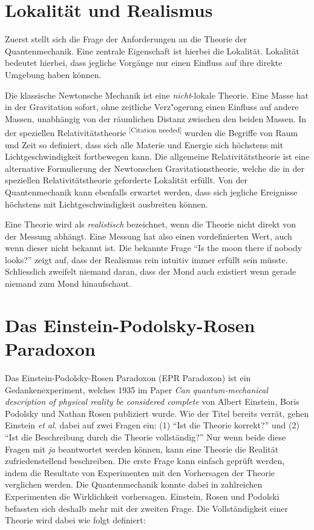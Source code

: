 \begin{refsection}
\section{Lokalit\"at und Realismus\label{section:bell:lokalitaet}}
Zuerst stellt sich die Frage der Anforderungen an die Theorie der
Quantenmechanik. Eine zentrale Eigenschaft ist hierbei die Lokalit\"at.
Lokalit\"at bedeutet hierbei, dass jegliche Vorg\"ange nur einen Einfluss
auf ihre direkte Umgebung haben k\"onnen.

Die klassische Newtonsche Mechanik ist eine \emph{nicht}-lokale 
Theorie. Eine Masse hat in der Gravitation sofort, ohne zeitliche 
Verz"ogerung einen Einfluss auf andere Massen, unabh\"angig von der
r\"aumlichen Distanz zwischen den beiden Massen. 
In der speziellen Relativit\"atstheorie 
\textsuperscript{[Citation needed]}
wurden die Begriffe von Raum und Zeit so definiert, dass sich alle
Materie und Energie sich h\"ochstens mit Lichtgeschwindigkeit fortbewegen
kann. 
Die allgemeine Relativit\"atstheorie ist eine alternative Formulierung
der Newtonschen Gravitationstheorie, welche die in der speziellen
Relativit\"atstheorie geforderte Lokalit\"at erf\"ullt.
Von der Quantenmechanik kann ebenfalls erwartet werden, dass sich
jegliche Ereignisse h\"ochstens mit Lichtgeschwindigkeit ausbreiten
k\"onnen.

Eine Theorie wird als \emph{realistisch} bezeichnet, wenn die Theorie
nicht direkt von der Messung abh\"angt. Eine Messung hat also einen
vordefinierten Wert, auch wenn dieser nicht bekannt ist.
Die bekannte Frage \enquote{Is the moon there if nobody looks?} zeigt auf,
dass der Realismus rein intuitiv immer erf\"ullt sein m\"usste. Schliesslich
zweifelt niemand daran, dass der Mond auch existiert wenn gerade niemand
zum Mond hinaufschaut.

\section{Das Einstein-Podolsky-Rosen Paradoxon}
Das Einstein-Podolsky-Rosen Paradoxon (EPR Paradoxon) ist ein 
Gedankenexperiment, welches 1935 im Paper \cite{Bell:Einstein1935}
\emph{Can quantum-mechanical description of physical reality be considered complete}
von Albert Einstein, Boris Podolsky und Nathan Rosen publiziert wurde.
Wie der Titel bereits verr\"at, gehen Einstein \emph{et al.} dabei auf
zwei Fragen ein: 
(1) \enquote{Ist die Theorie korrekt?}
und 
(2) \enquote{Ist die Beschreibung durch die Theorie vollst\"andig?}
Nur wenn beide diese Fragen mit \emph{ja} beantwortet werden k\"onnen, kann
eine Theorie die Realit\"at zufriedenstellend beschreiben.
Die erste Frage kann einfach gepr\"uft werden, indem die Resultate von
Experimenten mit den Vorhersagen der Theorie verglichen werden. 
Die Quantenmechanik konnte dabei in zahlreichen Experimenten die Wirklichkeit
vorhersagen. 
Einstein, Rosen und Podolski befassten sich deshalb mehr mit der zweiten
Frage. 
Die Vollst\"andigkeit einer Theorie wird dabei wie folgt definiert:


\end{refsection}
